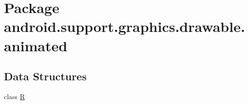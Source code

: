 \hypertarget{namespaceandroid_1_1support_1_1graphics_1_1drawable_1_1animated}{}\section{Package android.\+support.\+graphics.\+drawable.\+animated}
\label{namespaceandroid_1_1support_1_1graphics_1_1drawable_1_1animated}
\subsection*{Data Structures}
\begin{DoxyCompactItemize}
\item 
class \mbox{\hyperlink{classandroid_1_1support_1_1graphics_1_1drawable_1_1animated_1_1_r}{R}}
\end{DoxyCompactItemize}
